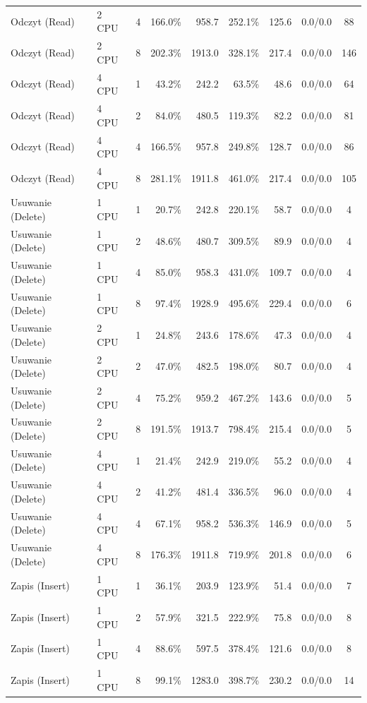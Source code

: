 \begin{table}[ht]
{\begin{tabular}{llcrrrrcc}
Odczyt (Read) & 2 CPU & 4 & 166.0\% & 958.7 & 252.1\% & 125.6 & 0.0/0.0 & 88 \\
Odczyt (Read) & 2 CPU & 8 & 202.3\% & 1913.0 & 328.1\% & 217.4 & 0.0/0.0 & 146 \\
Odczyt (Read) & 4 CPU & 1 & 43.2\% & 242.2 & 63.5\% & 48.6 & 0.0/0.0 & 64 \\
Odczyt (Read) & 4 CPU & 2 & 84.0\% & 480.5 & 119.3\% & 82.2 & 0.0/0.0 & 81 \\
Odczyt (Read) & 4 CPU & 4 & 166.5\% & 957.8 & 249.8\% & 128.7 & 0.0/0.0 & 86 \\
Odczyt (Read) & 4 CPU & 8 & 281.1\% & 1911.8 & 461.0\% & 217.4 & 0.0/0.0 & 105 \\
Usuwanie (Delete) & 1 CPU & 1 & 20.7\% & 242.8 & 220.1\% & 58.7 & 0.0/0.0 & 4 \\
Usuwanie (Delete) & 1 CPU & 2 & 48.6\% & 480.7 & 309.5\% & 89.9 & 0.0/0.0 & 4 \\
Usuwanie (Delete) & 1 CPU & 4 & 85.0\% & 958.3 & 431.0\% & 109.7 & 0.0/0.0 & 4 \\
Usuwanie (Delete) & 1 CPU & 8 & 97.4\% & 1928.9 & 495.6\% & 229.4 & 0.0/0.0 & 6 \\
Usuwanie (Delete) & 2 CPU & 1 & 24.8\% & 243.6 & 178.6\% & 47.3 & 0.0/0.0 & 4 \\
Usuwanie (Delete) & 2 CPU & 2 & 47.0\% & 482.5 & 198.0\% & 80.7 & 0.0/0.0 & 4 \\
Usuwanie (Delete) & 2 CPU & 4 & 75.2\% & 959.2 & 467.2\% & 143.6 & 0.0/0.0 & 5 \\
Usuwanie (Delete) & 2 CPU & 8 & 191.5\% & 1913.7 & 798.4\% & 215.4 & 0.0/0.0 & 5 \\
Usuwanie (Delete) & 4 CPU & 1 & 21.4\% & 242.9 & 219.0\% & 55.2 & 0.0/0.0 & 4 \\
Usuwanie (Delete) & 4 CPU & 2 & 41.2\% & 481.4 & 336.5\% & 96.0 & 0.0/0.0 & 4 \\
Usuwanie (Delete) & 4 CPU & 4 & 67.1\% & 958.2 & 536.3\% & 146.9 & 0.0/0.0 & 5 \\
Usuwanie (Delete) & 4 CPU & 8 & 176.3\% & 1911.8 & 719.9\% & 201.8 & 0.0/0.0 & 6 \\
Zapis (Insert) & 1 CPU & 1 & 36.1\% & 203.9 & 123.9\% & 51.4 & 0.0/0.0 & 7 \\
Zapis (Insert) & 1 CPU & 2 & 57.9\% & 321.5 & 222.9\% & 75.8 & 0.0/0.0 & 8 \\
Zapis (Insert) & 1 CPU & 4 & 88.6\% & 597.5 & 378.4\% & 121.6 & 0.0/0.0 & 8 \\
Zapis (Insert) & 1 CPU & 8 & 99.1\% & 1283.0 & 398.7\% & 230.2 & 0.0/0.0 & 14 \\

\end{tabular}}
\end{table}
